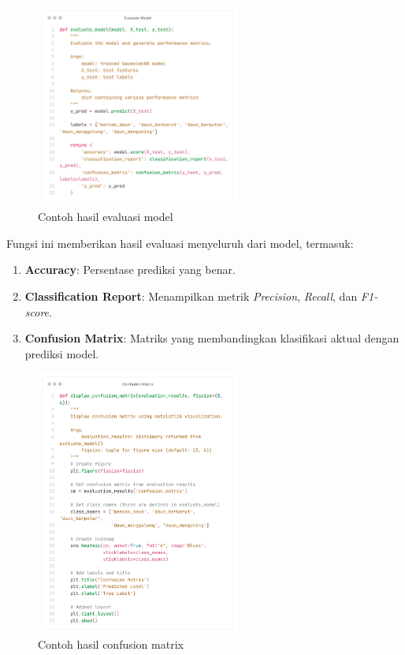 \begin{figure}[H]
  \centering
  \includegraphics[width=0.6\textwidth]{figure/chapter-4-evaluasi.png}
  \caption{Contoh hasil evaluasi model}
  \label{fig:extract_rgb}
\end{figure}

Fungsi ini memberikan hasil evaluasi menyeluruh dari model, termasuk:
\begin{enumerate}
    \item {\textbf{Accuracy}: Persentase prediksi yang benar.}
    \item {\textbf{Classification Report}: Menampilkan metrik \textit{Precision}, \textit{Recall}, dan \textit{F1-score}.}
    \item {\textbf{Confusion Matrix}: Matriks yang membandingkan klasifikasi aktual dengan prediksi model.}
\end{enumerate}

\begin{figure}[H]
  \centering
  \includegraphics[width=0.6\textwidth]{figure/chapter-4-confusion.png}
  \caption{Contoh hasil confusion matrix}
  \label{fig:extract_rgb}
\end{figure}

